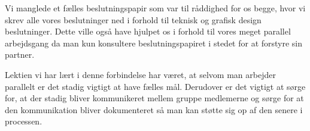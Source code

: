Vi manglede et fælles beslutningspapir som var til råddighed for os begge, hvor vi skrev alle vores beslutninger ned i forhold til teknisk og grafisk design beslutninger. Dette ville også have hjulpet os i forhold til vores meget parallel arbejdsgang da man kun konsultere beslutningspapiret i stedet for at forstyre sin partner.

Lektien vi har lært i denne forbindelse har været, at selvom man arbejder parallelt er det stadig vigtigt at have fælles mål. Derudover er det vigtigt at sørge for, at der stadig bliver kommunikeret mellem gruppe medlemerne og sørge for at den kommunikation bliver dokumenteret så man kan støtte sig op af den senere i processen.